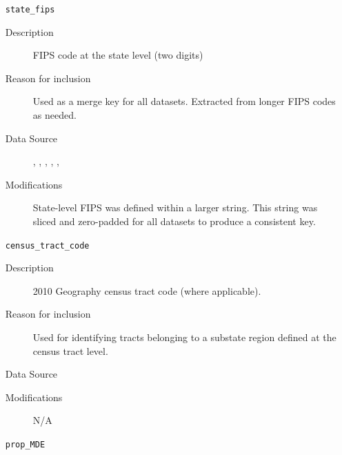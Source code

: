 \documentclass{article}
\begin{document}
\begin{itemize}[label={}, align=left]
    \item[\texttt{state\_fips}] \
          \begin{description}
              \item[Description] FIPS code at the state level (two digits) \\
              \item[Reason for inclusion] Used as a merge key for all datasets.
                    Extracted from longer FIPS codes as needed. \\
              \item[Data Source]
                    \cite{acs_demographics_data},
                    \cite{acs_poverty_data},
                    \cite{acs_income_data},
                    \cite{acs_marital_data},
                    \cite{acs_education_data},
                    \cite{samhsa_data} \\
              \item[Modifications] State-level FIPS was defined within a
                    larger string. This string was sliced and zero-padded for all
                    datasets to produce a consistent key. \\
          \end{description}
    \item[\texttt{census\_tract\_code}] \
          \begin{description}
              \item[Description] 2010 Geography census tract code (where
                    applicable).
              \item[Reason for inclusion] Used for identifying tracts belonging
                    to a substate region defined at the census tract level.
              \item[Data Source] \cite{samhsa_substate_region_defs}
              \item[Modifications] N/A
          \end{description}
    \item[\texttt{prop\_MDE}] \

\end{itemize}
\end{document}
